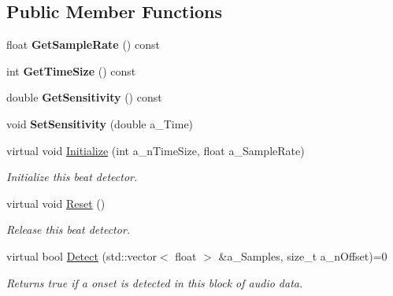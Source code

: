 \subsection*{Public Member Functions}
\begin{DoxyCompactItemize}
\item 
\mbox{\label{class_i_beat_detect_a5ce3a9fb18f79ba58ac63942c8210b23}} 
float {\bfseries Get\+Sample\+Rate} () const
\item 
\mbox{\label{class_i_beat_detect_ad5510f3bff3944f3abdedd26f158fdc8}} 
int {\bfseries Get\+Time\+Size} () const
\item 
\mbox{\label{class_i_beat_detect_a3cb01954186a93107d1621d271a58797}} 
double {\bfseries Get\+Sensitivity} () const
\item 
\mbox{\label{class_i_beat_detect_a71f530d091f24436cce9ff6869c14441}} 
void {\bfseries Set\+Sensitivity} (double a\+\_\+\+Time)
\item 
\mbox{\label{class_i_beat_detect_a7aba35484c282fdb8a605eb673afa78c}} 
virtual void \hyperlink{class_i_beat_detect_a7aba35484c282fdb8a605eb673afa78c}{Initialize} (int a\+\_\+n\+Time\+Size, float a\+\_\+\+Sample\+Rate)
\begin{DoxyCompactList}\small\item\em Initialize this beat detector. \end{DoxyCompactList}\item 
\mbox{\label{class_i_beat_detect_a141dca9bde5f8db117944cbd198bb3d6}} 
virtual void \hyperlink{class_i_beat_detect_a141dca9bde5f8db117944cbd198bb3d6}{Reset} ()
\begin{DoxyCompactList}\small\item\em Release this beat detector. \end{DoxyCompactList}\item 
\mbox{\label{class_i_beat_detect_ac6c42852e234557f636c99c24eb6770c}} 
virtual bool \hyperlink{class_i_beat_detect_ac6c42852e234557f636c99c24eb6770c}{Detect} (std\+::vector$<$ float $>$ \&a\+\_\+\+Samples, size\+\_\+t a\+\_\+n\+Offset)=0
\begin{DoxyCompactList}\small\item\em Returns true if a onset is detected in this block of audio data. \end{DoxyCompactList}\end{DoxyCompactItemize}
